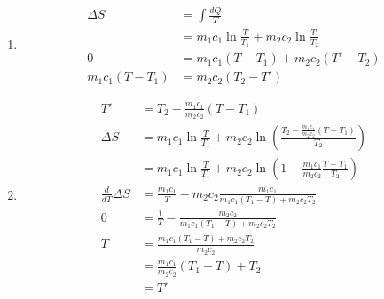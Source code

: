 \documentclass{article}
\begin{document}
\begin{enumerate}
  \item

        \begin{align*}
          \Delta S          & = \int \frac{dQ}{T}                                      \\
                            & = m_1 c_1 \ln \frac{T}{T_1} + m_2 c_2 \ln \frac{T'}{T_2} \\
          0                 & = m_1 c_1 (T - T_1) + m_2 c_2 (T' - T_2)                 \\
          m_1 c_1 (T - T_1) & = m_2 c_2 (T_2 - T')
        \end{align*}

  \item

        \begin{align*}
          T'                     & = T_2 - \frac{m_1 c_1}{m_2 c_2} (T - T_1)                                                                    \\
          \Delta S               & = m_1 c_1 \ln \frac{T}{T_1} + m_2 c_2 \ln \left( \frac{T_2 - \frac{m_1 c_1}{m_2 c_2} (T - T_1)}{T_2} \right) \\
                                 & = m_1 c_1 \ln \frac{T}{T_1} + m_2 c_2 \ln \left( 1 - \frac{m_1 c_1}{m_2 c_2} \frac{T - T_1}{T_2} \right)     \\
          \frac{d}{d T} \Delta S & = \frac{m_1 c_1}{T} - m_2 c_2 \frac{m_1 c_1}{m_1 c_1 (T_1 - T) + m_2 c_2 T_2}                                \\
          0                      & = \frac{1}{T} - \frac{m_2 c_2}{m_1 c_1 (T_1 - T) + m_2 c_2 T_2}                                              \\
          T                      & = \frac{m_1 c_1 (T_1 - T) + m_2 c_2 T_2}{m_2 c_2}                                                            \\
                                 & = \frac{m_1 c_1}{m_2 c_2} (T_1 - T) + T_2                                                                    \\
                                 & = T'
        \end{align*}
\end{enumerate}

\setcounter{subsubsection}{54}
\subsubsection{}
\end{document}
